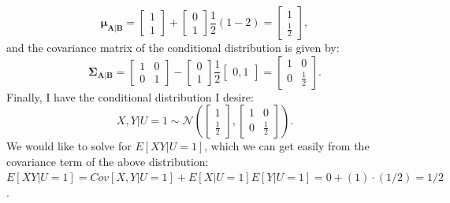 \begin{problem}{3}
\begin{equation*}
\bm{\mu_{A|B}} = \begin{bmatrix} 1 \\ 1 \end{bmatrix}+\begin{bmatrix} 0\\1 \end{bmatrix}\frac{1}{2}(1-2)=\begin{bmatrix} 1 \\ \frac{1}{2}\end{bmatrix},
\end{equation*}
and the covariance matrix of the conditional distribution is given by:
\begin{equation*}
\bm{\Sigma_{A|B}} =\left[\begin{matrix}
    1& 0\\
    0& 1 
\end{matrix}\right] -\left[\begin{matrix}
    0 \\
    1
\end{matrix}\right] \frac{1}{2}\left[\begin{matrix}
    0,1 
\end{matrix}\right] = \left[\begin{matrix}
1 & 0\\
0& \frac{1}{2}
\end{matrix}\right].
\end{equation*}
Finally, I have the conditional distribution I desire:
\begin{equation*}
X,Y|U=1 \sim \mathcal N \left(\begin{bmatrix} 1 \\ \frac{1}{2}\end{bmatrix},   \left[\begin{matrix}
1 & 0\\
0& \frac{1}{2}
\end{matrix}\right] \right).
\end{equation*}
We would like to solve for $E[XY|U=1]$, which we can get easily from the covariance term of the above distribution: $E[XY|U=1] = Cov[X, Y|U=1]+E[X|U=1]E[Y|U=1] = 0 +(1)\cdot (1/2) = 1/2$.

\end{problem}


